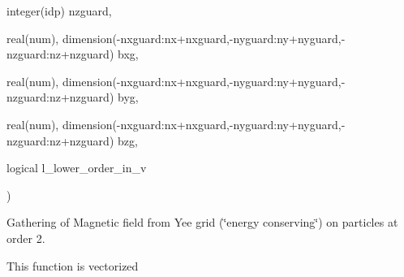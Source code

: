 {\begin{DoxyParamCaption}
\item[{integer(idp)}]{nzguard, }
\item[{real(num), dimension(-\/nxguard\+:nx+nxguard,-\/nyguard\+:ny+nyguard,-\/nzguard\+:nz+nzguard)}]{bxg, }
\item[{real(num), dimension(-\/nxguard\+:nx+nxguard,-\/nyguard\+:ny+nyguard,-\/nzguard\+:nz+nzguard)}]{byg, }
\item[{real(num), dimension(-\/nxguard\+:nx+nxguard,-\/nyguard\+:ny+nyguard,-\/nzguard\+:nz+nzguard)}]{bzg, }
\item[{logical}]{l\+\_\+lower\+\_\+order\+\_\+in\+\_\+v}
\end{DoxyParamCaption}
)}\hypertarget{field__gathering__3d__o2_8_f90_aaa9c36b2c9467ccd77152e8a92ecfabe}{}\label{field__gathering__3d__o2_8_f90_aaa9c36b2c9467ccd77152e8a92ecfabe}


Gathering of Magnetic field from Yee grid (\char`\"{}energy conserving\char`\"{}) on particles at order 2. 

This function is vectorized 
